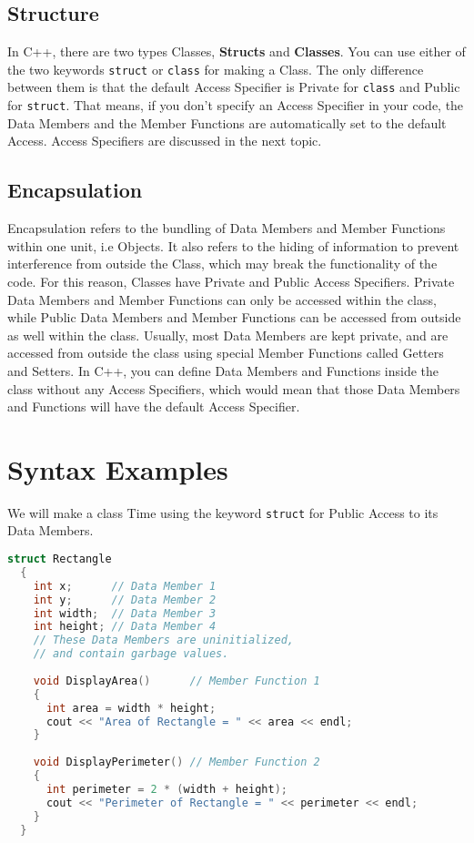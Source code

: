 \documentclass[11pt,fleqn]{book} %
\begin{document}
\subsection{Structure}

In C++, there are two types Classes, \textbf{Structs} and \textbf{Classes}. You can use either of the two keywords \texttt{struct} or \texttt{class} for making a Class. The only difference between them is that the default Access Specifier is Private for \texttt{class} and Public for \texttt{struct}. That means, if you don't specify an Access Specifier in your code, the Data Members and the Member Functions are automatically set to the default Access. Access Specifiers are discussed in the next topic.

\subsection{Encapsulation}

Encapsulation refers to the bundling of Data Members and Member Functions within one unit, i.e Objects. It also refers to the hiding of information to prevent interference from outside the Class, which may break the functionality of the code. For this reason, Classes have Private and Public Access Specifiers. Private Data Members and Member Functions can only be accessed within the class, while Public Data Members and Member Functions can be accessed from outside as well within the class. Usually, most Data Members are kept private, and are accessed from outside the class using special Member Functions called Getters and Setters. In C++, you can define Data Members and Functions inside the class without any Access Specifiers, which would mean that those Data Members and Functions will have the default Access Specifier.

\section{Syntax Examples}

We will make a class Time using the keyword \texttt{struct} for Public Access to its Data Members.

\begin{lstlisting}[language=C++, caption=Class Definition using the \texttt{struct} keyword in C++]
  struct Rectangle
  {
    int x;      // Data Member 1
    int y;      // Data Member 2
    int width;  // Data Member 3
    int height; // Data Member 4
    // These Data Members are uninitialized,
    // and contain garbage values.
    
    void DisplayArea()      // Member Function 1
    {
      int area = width * height;
      cout << "Area of Rectangle = " << area << endl;
    }
    
    void DisplayPerimeter() // Member Function 2
    {
      int perimeter = 2 * (width + height);
      cout << "Perimeter of Rectangle = " << perimeter << endl;
    }
  }
\end{lstlisting}
\end{document}
